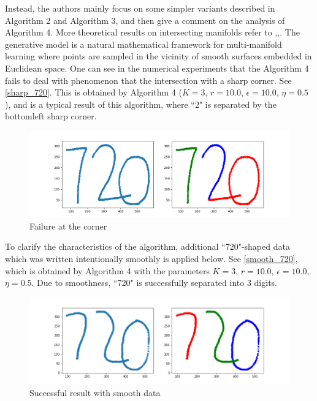 \documentclass{article}
\begin{document}
Instead, the authors mainly focus on some simpler variants described in Algorithm 2 and Algorithm 3, and then give a comment on the analysis of Algorithm 4.
More theoretical results on intersecting manifolds 
refer to \cite{arias2011},\cite{chen2009},\cite{soltanolkotabi2012}.
The generative model is a natural mathematical framework for multi-manifold learning where points are sampled in the vicinity of smooth surfaces embedded in Euclidean space.
One can see in the numerical experiments that the Algorithm 4 fails to deal with phenomenon that the intersection with a sharp corner.
See \autoref{sharp_720}. This is obtained by  Algorithm 4  ($K = 3$, $r = 10.0$, $\epsilon = 10.0$, $\eta = 0.5$), and is a typical result of this algorithm, where ``2" is separated by the bottomleft sharp corner.
\begin{figure}[htbp]
\centering
\vspace{-1em}
\includegraphics[width=0.9  \textwidth]{sharp_720.png}
\vspace{-1em}
\caption{Failure at the corner}
\label{sharp_720}
\end{figure}

To clarify the characteristics of the algorithm, additional ``720"-shaped data which was written intentionally smoothly is applied below.
See \autoref{smooth_720}, which is obtained by Algorithm 4 with the parameters $K = 3$, $r = 10.0$, $\epsilon = 10.0$, $\eta = 0.5$.
Due to smoothness, ``720" is successfully separated into 3 digits.

\begin{figure}[htbp]
\centering
\vspace{-1em}
\includegraphics[width=0.9  \textwidth]{smooth_720_1.png}
\vspace{-1em}
\caption{Successful result with smooth data}
\label{smooth_720}
\end{figure}
\end{document}
